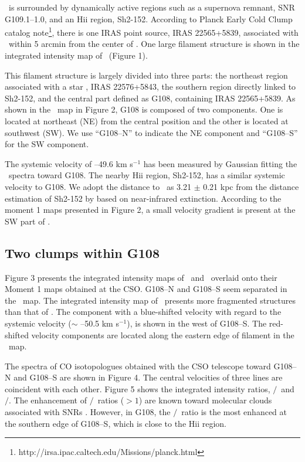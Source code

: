 \documentclass[manuscript]{aastex}
\begin{document}
\sou\ is surrounded by dynamically active regions such as a supernova remnant, SNR G109.1--1.0, and an H{\sc ii} region, Sh2-152.
According to Planck Early Cold Clump catalog note\footnote{http://irsa.ipac.caltech.edu/Missions/planck.html}, there is one IRAS point source, IRAS 22565+5839, associated with \sou\ within 5 arcmin from the center of \sou.
One large filament structure is shown in the integrated intensity map of \tco\ (Figure 1).

This filament structure is largely divided into three parts: the northeast region associated with a star \citep{yung14}, IRAS 22576+5843, the southern region directly linked to Sh2-152, and the central part defined as G108, containing IRAS 22565+5839.
As shown in the \thco\ map in Figure 2, G108 is composed of two components.
One is located at northeast (NE) from the central position and the other is located at southwest (SW).
We use ``G108--N'' to indicate the NE component and ``G108--S'' for the SW component.

The systemic velocity of --49.6 km s$^{-1}$ has been measured by Gaussian fitting the \ceo\ spectra toward G108.
The nearby H{\sc ii} region, Sh2-152, has a similar systemic velocity to G108.
We adopt the distance to \sou\ as 3.21 $\pm$ 0.21 kpc from the distance estimation of Sh2-152 by \citet{ramirez11} based on near-infrared extinction.
According to the moment 1 maps presented in Figure 2, a small velocity gradient is present at the SW part of \sou.


\subsection{Two clumps within G108}

Figure 3 presents the integrated intensity maps of \tcot\ and \thcot\ overlaid onto their Moment 1 maps obtained at the CSO.
G108--N and G108--S seem separated in the \tcot\ map.
The integrated intensity map of \thcot\ presents more fragmented structures than that of \tcot.
The component with a blue-shifted velocity with regard to the systemic velocity ($\sim$ --50.5 km s$^{-1}$), is shown in the west of G108--S.
The red-shifted velocity components are located along the eastern edge of filament in the \thcot\ map.

The spectra of CO isotopologues obtained with the CSO telescope toward G108--N and G108--S are shown in Figure 4.
The central velocities of three lines are coincident with each other.
Figure 5 shows the integrated intensity ratios, \tcot$/$\tco\ and \thcot$/$\thco.
The enhancement of \tcot$/$\tco\ ratios ($> 1$) are known toward molecular clouds associated with SNRs \citep{seta98}.
However, in G108, the \thcot$/$\thco\ ratio is the most enhanced at the southern edge of G108--S, which is close to the H{\sc ii} region.
\end{document}
